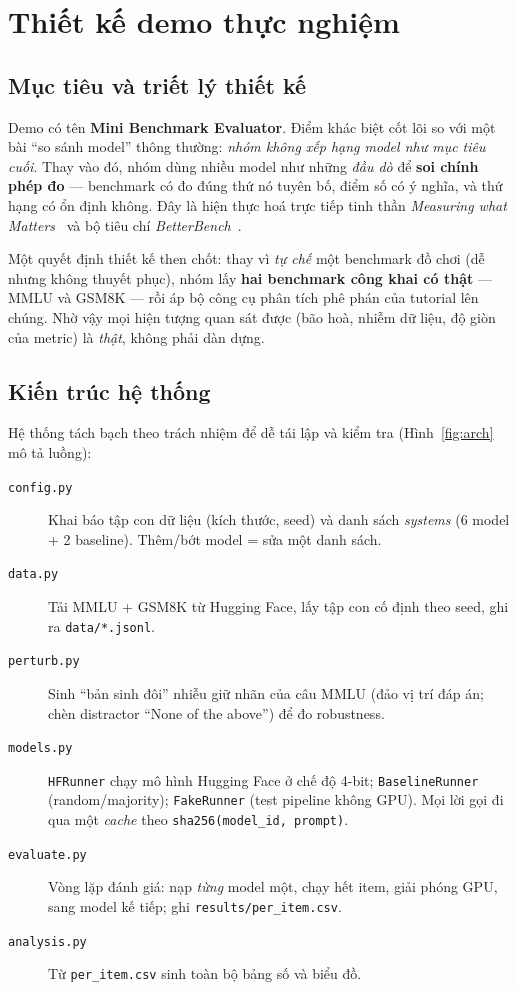 \section{Thiết kế demo thực nghiệm}
\label{sec:demo_design}

\subsection{Mục tiêu và triết lý thiết kế}

Demo có tên \textbf{Mini Benchmark Evaluator}. Điểm khác biệt cốt lõi so với một
bài ``so sánh model'' thông thường: \emph{nhóm không xếp hạng model như mục
tiêu cuối}. Thay vào đó, nhóm dùng nhiều model như những \emph{đầu dò} để
\textbf{soi chính phép đo} --- benchmark có đo đúng thứ nó tuyên bố, điểm số có ý
nghĩa, và thứ hạng có ổn định không. Đây là hiện thực hoá trực tiếp tinh thần
\emph{Measuring what Matters}~\cite{measuring_what_matters} và bộ tiêu chí
\emph{BetterBench}~\cite{betterbench}.

Một quyết định thiết kế then chốt: thay vì \emph{tự chế} một benchmark đồ chơi
(dễ nhưng không thuyết phục), nhóm lấy \textbf{hai benchmark công khai có
thật} --- MMLU và GSM8K --- rồi áp bộ công cụ phân tích phê phán của tutorial lên
chúng. Nhờ vậy mọi hiện tượng quan sát được (bão hoà, nhiễm dữ liệu, độ giòn của
metric) là \emph{thật}, không phải dàn dựng.

\subsection{Kiến trúc hệ thống}

Hệ thống tách bạch theo trách nhiệm để dễ tái lập và kiểm tra (Hình~\ref{fig:arch}
mô tả luồng):

\begin{description}
  \item[\texttt{config.py}] Khai báo tập con dữ liệu (kích thước, seed) và danh
    sách \emph{systems} (6 model + 2 baseline). Thêm/bớt model = sửa một danh sách.
  \item[\texttt{data.py}] Tải MMLU + GSM8K từ Hugging Face, lấy tập con cố định
    theo seed, ghi ra \texttt{data/*.jsonl}.
  \item[\texttt{perturb.py}] Sinh ``bản sinh đôi'' nhiễu giữ nhãn của câu MMLU
    (đảo vị trí đáp án; chèn distractor ``None of the above'') để đo robustness.
  \item[\texttt{models.py}] \texttt{HFRunner} chạy mô hình Hugging Face ở chế độ
    4-bit; \texttt{BaselineRunner} (random/majority); \texttt{FakeRunner} (test
    pipeline không GPU). Mọi lời gọi đi qua một \emph{cache} theo
    \texttt{sha256(model\_id, prompt)}.
  \item[\texttt{evaluate.py}] Vòng lặp đánh giá: nạp \emph{từng} model một, chạy
    hết item, giải phóng GPU, sang model kế tiếp; ghi \texttt{results/per\_item.csv}.
  \item[\texttt{analysis.py}] Từ \texttt{per\_item.csv} sinh toàn bộ bảng số và
    biểu đồ.
\end{description}

